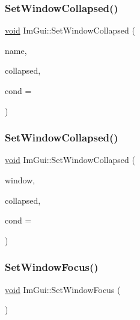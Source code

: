 \mbox{\label{namespaceImGui_ac349187d6aae141cd3b4476e54bcc338}} 
\subsubsection{\texorpdfstring{Set\+Window\+Collapsed()}{SetWindowCollapsed()}\hspace{0.1cm}{\footnotesize\ttfamily [2/3]}}
{\footnotesize\ttfamily \hyperlink{imgui__impl__opengl3__loader_8h_ac668e7cffd9e2e9cfee428b9b2f34fa7}{void} Im\+Gui\+::\+Set\+Window\+Collapsed (\begin{DoxyParamCaption}\item[{const char $\ast$}]{name,  }\item[{bool}]{collapsed,  }\item[{Im\+Gui\+Cond}]{cond = {} }\end{DoxyParamCaption})}

\mbox{\label{namespaceImGui_a728bb661ccd1b63fb5ee4d3a3e3d0b7e}} 
\subsubsection{\texorpdfstring{Set\+Window\+Collapsed()}{SetWindowCollapsed()}\hspace{0.1cm}{\footnotesize\ttfamily [3/3]}}
{\footnotesize\ttfamily \hyperlink{imgui__impl__opengl3__loader_8h_ac668e7cffd9e2e9cfee428b9b2f34fa7}{void} Im\+Gui\+::\+Set\+Window\+Collapsed (\begin{DoxyParamCaption}\item[{\hyperlink{structImGuiWindow}{Im\+Gui\+Window} $\ast$}]{window,  }\item[{bool}]{collapsed,  }\item[{Im\+Gui\+Cond}]{cond = {} }\end{DoxyParamCaption})}

\mbox{\label{namespaceImGui_ac71920931ed7b7c8594ee84c6a94e7b8}} 
\subsubsection{\texorpdfstring{Set\+Window\+Focus()}{SetWindowFocus()}\hspace{0.1cm}{\footnotesize\ttfamily [1/2]}}
{\footnotesize\ttfamily \hyperlink{imgui__impl__opengl3__loader_8h_ac668e7cffd9e2e9cfee428b9b2f34fa7}{void} Im\+Gui\+::\+Set\+Window\+Focus (\begin{DoxyParamCaption}{ }\end{DoxyParamCaption})}

